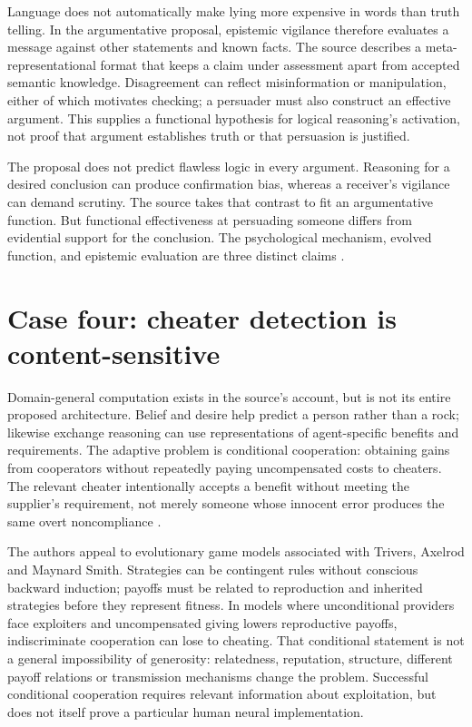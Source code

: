 Language does not automatically make lying more expensive in words
than truth telling. In the argumentative proposal, epistemic vigilance
therefore evaluates a message against other statements and known facts.
The source describes a meta-representational format that keeps a claim
under assessment apart from accepted semantic knowledge. Disagreement
can reflect misinformation or manipulation, either of which motivates
checking; a persuader must also construct an effective argument.
This supplies a functional hypothesis for logical reasoning's activation,
not proof that argument establishes truth or that persuasion is justified.

The proposal does not predict flawless logic in every argument.
Reasoning for a desired conclusion can produce confirmation bias,
whereas a receiver's vigilance can demand scrutiny. The source takes
that contrast to fit an argumentative function. But functional
effectiveness at persuading someone differs from evidential support
for the conclusion. The psychological mechanism, evolved function,
and epistemic evaluation are three distinct claims
\cite[p.~638]{CosmidesTooby2021Adaptationism}.

\section{Case four: cheater detection is content-sensitive}
\label{sec:p11-rat106-exchange}

Domain-general computation exists in the source's account, but is not
its entire proposed architecture. Belief and desire help predict a
person rather than a rock; likewise exchange reasoning can use
representations of agent-specific benefits and requirements. The
adaptive problem is conditional cooperation: obtaining gains from
cooperators without repeatedly paying uncompensated costs to cheaters.
The relevant cheater intentionally accepts a benefit without meeting
the supplier's requirement, not merely someone whose innocent error
produces the same overt noncompliance
\cite[pp.~638--640]{CosmidesTooby2021Adaptationism}.

The authors appeal to evolutionary game models associated with Trivers,
Axelrod and Maynard Smith. Strategies can be contingent rules without
conscious backward induction; payoffs must be related to reproduction
and inherited strategies before they represent fitness. In models where
unconditional providers face exploiters and uncompensated giving lowers
reproductive payoffs, indiscriminate cooperation can lose to cheating.
That conditional statement is not a general impossibility of generosity:
relatedness, reputation, structure, different payoff relations or
transmission mechanisms change the problem. Successful conditional
cooperation requires relevant information about exploitation, but does
not itself prove a particular human neural implementation.

